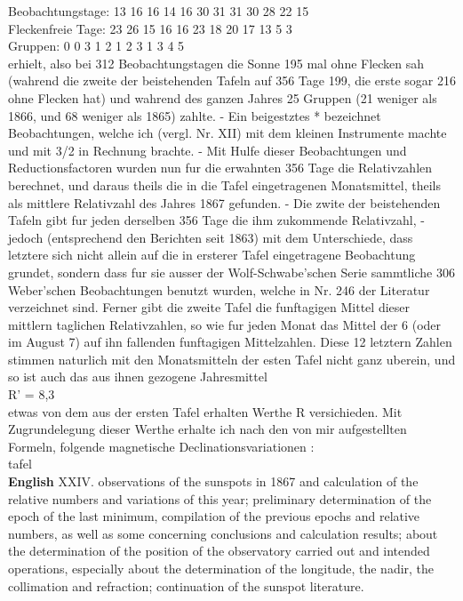 \documentclass[12pt]{article}
\begin{document}
Beobachtungstage: 13 16 16 14 16 30 31 31 30 28 22 15\\
Fleckenfreie Tage:    23 26 15 16 16 23 18 20 17 13 5 3\\
Gruppen:      0   0   3   1    2   1   2    3   1   3 4 5\\

erhielt, also bei 312 Beobachtungstagen die Sonne 195 mal ohne Flecken sah (wahrend die zweite der beistehenden Tafeln auf 356 Tage 199, die erste sogar 216 ohne Flecken hat) und wahrend des ganzen Jahres 25 Gruppen (21 weniger als 1866, und 68 weniger als 1865) zahlte. - Ein beigestztes * bezeichnet Beobachtungen, welche ich (vergl. Nr. XII) mit dem kleinen Instrumente machte und mit 3/2 in Rechnung brachte. - Mit Hulfe dieser Beobachtungen und Reductionsfactoren wurden nun fur die erwahnten 356 Tage die Relativzahlen berechnet, und daraus theils die in die Tafel eingetragenen Monatsmittel, theils als mittlere Relativzahl des Jahres 1867 gefunden. - Die zwite der beistehenden Tafeln gibt fur jeden derselben 356 Tage die ihm zukommende Relativzahl, - jedoch (entsprechend den Berichten seit 1863) mit dem Unterschiede, dass letztere sich nicht allein auf die in ersterer Tafel eingetragene Beobachtung grundet, sondern dass fur sie ausser der Wolf-Schwabe'schen Serie sammtliche 306 Weber'schen Beobachtungen benutzt wurden, welche in Nr. 246 der Literatur verzeichnet sind. Ferner gibt die zweite Tafel die funftagigen Mittel dieser mittlern taglichen Relativzahlen, so wie fur jeden Monat das Mittel der 6 (oder im August 7) auf ihn fallenden funftagigen Mittelzahlen. Diese 12 letztern Zahlen stimmen naturlich mit den Monatsmitteln der esten Tafel nicht ganz uberein, und so ist auch das aus ihnen gezogene Jahresmittel\\

R' = 8,3\\

etwas von dem aus der ersten Tafel erhalten Werthe R versichieden. Mit Zugrundelegung dieser Werthe erhalte ich nach den von mir aufgestellten Formeln, folgende magnetische Declinationsvariationen :\\

\<tafel\>
\hdots {}\\


\textbf{English}
XXIV. observations of the sunspots in 1867 and calculation of the relative numbers and variations of this year; preliminary determination of the epoch of the last minimum, compilation of the previous epochs and relative numbers, as well as some concerning conclusions and calculation results; about the determination of the position of the observatory carried out and intended operations, especially about the determination of the longitude, the nadir, the collimation and refraction; continuation of the sunspot literature.\\
\end{document}
